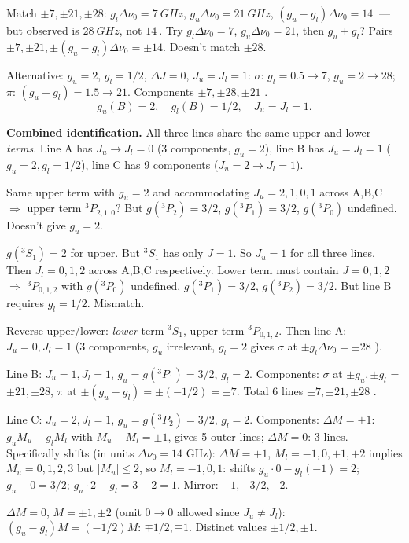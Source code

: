 \documentclass[11pt]{article}
\begin{document}
Match $\pm 7,\pm 21,\pm 28$: $g_l\Delta\nu_0=\SI{7}{GHz}$, $g_u\Delta\nu_0=\SI{21}{GHz}$,
$(g_u-g_l)\Delta\nu_0 = \SI{14}{}$ --- but observed is $\SI{28}{GHz}$, not $\SI{14}{}$.
Try $g_l\Delta\nu_0 = 7$, $g_u\Delta\nu_0 = 21$, then $g_u+g_l$? Pairs $\pm 7,\pm 21,\pm(g_u-g_l)\Delta\nu_0=\pm 14$. Doesn't match $\pm 28$.

Alternative: $g_u = 2$, $g_l = 1/2$, $\Delta J=0$, $J_u = J_l = 1$:
$\sigma$: $g_l = 0.5\to 7$, $g_u = 2\to 28$; $\pi$: $(g_u-g_l)=1.5\to 21$.
Components $\pm 7,\pm 28,\pm 21$ \checkmark.
\[
\boxed{\;g_u(B) = 2,\quad g_l(B) = 1/2,\quad J_u = J_l = 1.\;}
\]

\textbf{Combined identification.} All three lines share the same upper and lower
\emph{terms}. Line A has $J_u\to J_l = 0$ (3 components, $g_u=2$), line B has
$J_u = J_l = 1$ ($g_u=2,g_l=1/2$), line C has 9 components ($J_u=2\to J_l=1$).

Same upper term with $g_u=2$ and accommodating $J_u=2,1,0,1$ across A,B,C $\Rightarrow$
upper term ${}^3P_{2,1,0}$? But $g({}^3P_2)=3/2$, $g({}^3P_1)=3/2$, $g({}^3P_0)$ undefined. Doesn't give $g_u=2$.

$g({}^3S_1)=2$ \checkmark for upper. But ${}^3S_1$ has only $J=1$. So $J_u=1$ for
all three lines. Then $J_l = 0,1,2$ across A,B,C respectively. Lower term must
contain $J=0,1,2$ $\Rightarrow$ ${}^3P_{0,1,2}$ with $g({}^3P_0)$ undefined,
$g({}^3P_1)=3/2$, $g({}^3P_2)=3/2$. But line B requires $g_l = 1/2$. Mismatch.

Reverse upper/lower: \emph{lower} term ${}^3S_1$, upper term ${}^3P_{0,1,2}$. Then
line A: $J_u=0,J_l=1$ (3 components, $g_u$ irrelevant, $g_l=2$ gives $\sigma$ at
$\pm g_l\Delta\nu_0=\pm 28$ \checkmark).

Line B: $J_u=1,J_l=1$, $g_u=g({}^3P_1)=3/2$, $g_l=2$. Components: $\sigma$ at
$\pm g_u, \pm g_l$ = $\pm 21,\pm 28$, $\pi$ at $\pm(g_u-g_l)=\pm(-1/2)=\pm 7$.
Total 6 lines $\pm 7,\pm 21,\pm 28$ \checkmark.

Line C: $J_u=2,J_l=1$, $g_u=g({}^3P_2)=3/2$, $g_l=2$. Components:
$\Delta M=\pm 1$: $g_u M_u - g_l M_l$ with $M_u-M_l=\pm 1$, gives 5 outer lines;
$\Delta M=0$: 3 lines. Specifically shifts (in units $\Delta\nu_0=14$ GHz):
$\Delta M=+1$, $M_l=-1,0,+1,+2$ implies $M_u=0,1,2,3$ but $|M_u|\leq 2$, so
$M_l=-1,0,1$: shifts $g_u\cdot 0-g_l(-1)=2$; $g_u-0=3/2$; $g_u\cdot 2-g_l=3-2=1$.
Mirror: $-1,-3/2,-2$.

$\Delta M=0$, $M=\pm 1,\pm 2$ (omit $0\to 0$ allowed since $J_u\neq J_l$):
$(g_u-g_l)M = (-1/2)M$: $\mp 1/2,\mp 1$. Distinct values $\pm 1/2,\pm 1$.
\end{document}

